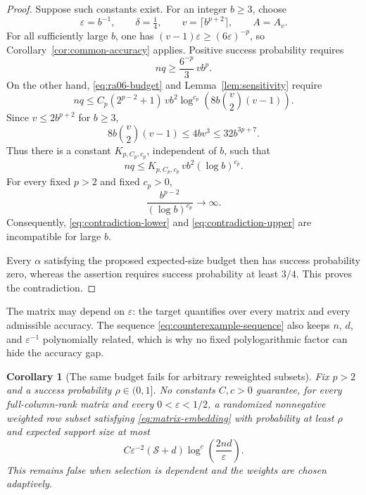 \documentclass[11pt]{article}
\theoremstyle{spaced}
\newtheorem{corollary}[theorem]{Corollary}
\numberwithin{equation}{section}
\newcommand{\Sp}{\mathcal{S}}
\begin{document}
\begin{proof}
Suppose such constants exist. For an integer $b\ge3$, choose
\begin{equation}\label{eq:counterexample-sequence}
 \varepsilon=b^{-1},\qquad\delta=\tfrac14,
 \qquad v=\lceil b^{p+2}\rceil,\qquad A=A_v.
\end{equation}
For all sufficiently large $b$, one has
$(v-1)\varepsilon\ge(6\varepsilon)^{-p}$, so
Corollary~\ref{cor:common-accuracy} applies. Positive success probability
requires
\begin{equation}\label{eq:contradiction-lower}
 nq\ge\frac{6^{-p}}3\,v b^p.
\end{equation}
On the other hand, \eqref{eq:ra06-budget} and
Lemma~\ref{lem:sensitivity} require
\begin{equation}\label{eq:contradiction-upper-raw}
 nq\le C_p(2^{p-2}+1)\,vb^2
       \log^{c_p}\!\left(8b\binom v2(v-1)\right).
\end{equation}
Since $v\le2b^{p+2}$ for $b\ge3$,
\[
 8b\binom v2(v-1)\le4bv^3\le32b^{3p+7}.
\]
Thus there is a constant $K_{p,C_p,c_p}$, independent of $b$, such that
\begin{equation}\label{eq:contradiction-upper}
 nq\le K_{p,C_p,c_p}\,vb^2(\log b)^{c_p}.
\end{equation}
For every fixed $p>2$ and fixed $c_p>0$,
\[
 \frac{b^{p-2}}{(\log b)^{c_p}}\longrightarrow\infty.
\]
Consequently, \eqref{eq:contradiction-lower} and
\eqref{eq:contradiction-upper} are incompatible for large $b$.

Every $\alpha$ satisfying the proposed expected-size budget then has
success probability zero, whereas the assertion requires success
probability at least $3/4$. This proves the contradiction.
\end{proof}

The matrix may depend on $\varepsilon$: the target quantifies over
every matrix and every admissible accuracy. The sequence
\eqref{eq:counterexample-sequence} also keeps $n$, $d$, and
$\varepsilon^{-1}$ polynomially related, which is why no fixed
polylogarithmic factor can hide the accuracy gap.

\begin{corollary}[The same budget fails for arbitrary reweighted subsets]
\label{cor:general-budget}
Fix $p>2$ and a success probability $\rho\in(0,1]$. No constants
$C,c>0$ guarantee, for every full-column-rank matrix and every
$0<\varepsilon<1/2$, a randomized nonnegative weighted row subset
satisfying \eqref{eq:matrix-embedding} with probability at least $\rho$
and expected support size at most
\[
 C\varepsilon^{-2}(\Sp+d)
 \log^c\!\left(\frac{2nd}{\varepsilon}\right).
\]
This remains false when selection is dependent and the weights are
chosen adaptively.
\end{corollary}
\end{document}
